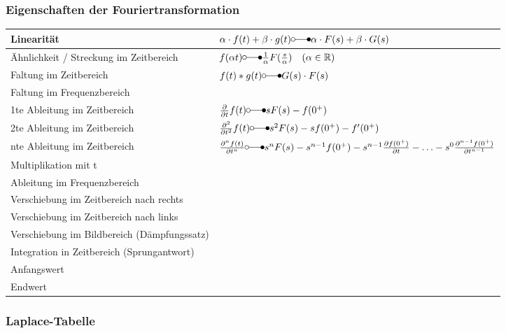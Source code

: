 \subsubsection{Eigenschaften der Fouriertransformation}
\begin{tabular}{|l|l|}
	\hline Linearität	& $\alpha\cdot f(t) + \beta\cdot g(t) \laplace \alpha\cdot F(s) + \beta\cdot G(s)$\\
	\hline Ähnlichkeit / Streckung im Zeitbereich & $f(\alpha t) \laplace \frac{1}{\alpha}F(\frac{s}{\alpha})\quad (\alpha \in \mathbb{R})$\\
	\hline Faltung im Zeitbereich & $f(t) * g(t) \laplace G(s) \cdot F(s)$\\
	\hline Faltung im Frequenzbereich & \\
	\hline 1te Ableitung im Zeitbereich & $\frac{\partial}{\partial t}f(t) \laplace sF(s) - f(0^{+})$\\
	\hline 2te Ableitung im Zeitbereich & $\frac{\partial^{2}}{\partial t^{2}}f(t) \laplace s^{2}F(s) - sf(0^{+}) - f'(0^{+})$\\
	\hline nte Ableitung im Zeitbereich & $\frac{\partial^{n}f(t)}{\partial t^{n}} \laplace s^{n}F(s) - s^{n-1}f(0^{+}) - s^{n-1}\frac{\partial f(0^{+})}{\partial t}- \ldots - s^{0}\frac{\partial^{n-1}f(0^{+})}{\partial t^{n-1}}$\\
	\hline Multiplikation mit t & \\
	\hline Ableitung im Frequenzbereich & \\
	\hline Verschiebung im Zeitbereich nach rechts & \\
	\hline Verschiebung im Zeitbereich nach links & \\
	\hline Verschiebung im Bildbereich (Dämpfungssatz) & \\
	\hline Integration in Zeitbereich (Sprungantwort) & \\
	\hline Anfangswert & \\
	\hline Endwert & \\
	\hline
\end{tabular}
\subsubsection{Laplace-Tabelle}